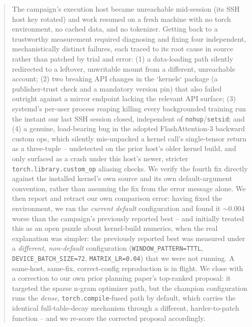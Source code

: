 \documentclass{article}
\begin{document}
\printAffiliationsAndNotice{}

\begin{abstract}
The campaign's execution host became unreachable mid-session (its SSH host key rotated) and work resumed on a fresh machine with no torch environment, no cached data, and no tokenizer. Getting back to a trustworthy measurement required diagnosing and fixing four independent, mechanistically distinct failures, each traced to its root cause in source rather than patched by trial and error: (1) a data-loading path silently redirected to a leftover, unwritable mount from a different, unreachable account; (2) two breaking API changes in the `kernels` package (a publisher-trust check and a mandatory version pin) that also failed outright against a mirror endpoint lacking the relevant API surface; (3) systemd's per-user process reaping killing every backgrounded training run the instant our last SSH session closed, independent of \texttt{nohup}/\texttt{setsid}; and (4) a genuine, load-bearing bug in the adopted FlashAttention-3 backward custom ops, which silently mis-unpacked a kernel call's single-tensor return as a three-tuple -- undetected on the prior host's older kernel build, and only surfaced as a crash under this host's newer, stricter \texttt{torch.library.custom\_op} aliasing checks. We verify the fourth fix directly against the installed kernel's own source and its own default-argument convention, rather than assuming the fix from the error message alone. We then report and retract our own comparison error: having fixed the environment, we ran the \emph{current default} configuration and found it $\sim$0.004 worse than the campaign's previously reported best -- and initially treated this as an open puzzle about kernel-build numerics, when the real explanation was simpler: the previously reported best was measured under a \emph{different, non-default} configuration (\texttt{WINDOW\_PATTERN=TTTL}, \texttt{DEVICE\_BATCH\_SIZE=72}, \texttt{MATRIX\_LR=0.04}) that we were not running. A same-host, same-fix, correct-config reproduction is in flight. We close with a correction to our own prior planning paper's top-ranked proposal: it targeted the sparse n-gram optimizer path, but the champion configuration runs the \emph{dense}, \texttt{torch.compile}-fused path by default, which carries the identical full-table-decay mechanism through a different, harder-to-patch function -- and we re-score the corrected proposal accordingly.
\end{abstract}
\end{document}

